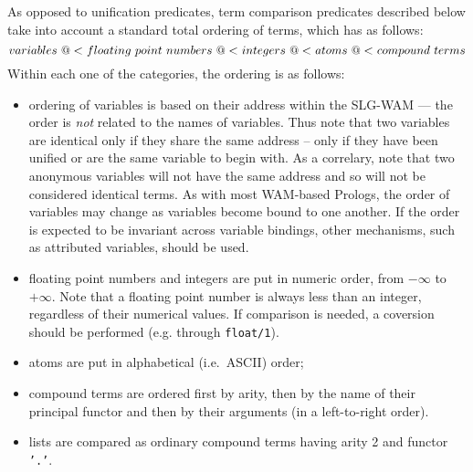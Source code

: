 As opposed to unification predicates, term comparison predicates
described below take into account a standard total ordering of terms,
which has as follows:
%
\[ 
variables \ {\tt @<} \ floating \ point \ numbers \ {\tt @<} \ integers \ {\tt @<} \ atoms \ {\tt @<} \ compound \ terms 
\] 
%
Within each one of the categories, the ordering is as follows:
\begin{itemize}
\item ordering of variables is based on their address within the
  SLG-WAM --- the order is {\em not\/} related to the names of
  variables.  Thus note that two variables are identical only if they
  share the same address -- only if they have been unified or are the
  same variable to begin with.  As a correlary, note that two
  anonymous variables will not have the same address and so will not
  be considered identical terms.  As with most WAM-based Prologs, the
  order of variables may change as variables become bound to one
  another.  If the order is expected to be invariant across variable
  bindings, other mechanisms, such as attributed variables, should be
  used.
\item floating point numbers and integers are put in numeric order,
  from $-\infty$ to $+\infty$.  Note that a floating point number is
  always less than an integer, regardless of their numerical values.
  If comparison is needed, a coversion should be performed
  (e.g. through {\tt float/1}).
\item	atoms are put in alphabetical (i.e.\ ASCII) order;
\item	compound terms are ordered first by arity, then by the name of their
	principal functor and then by their arguments (in a left-to-right 
	order).
\item	lists are compared as ordinary compound terms having arity 2 and 
	functor {\tt '.'}.
\end{itemize}

